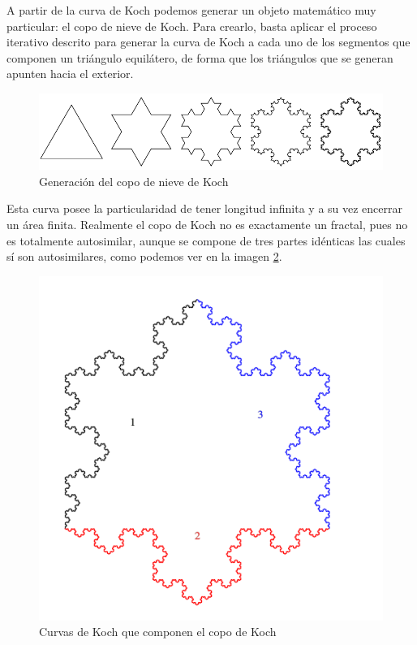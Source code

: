 A partir de la curva de Koch podemos generar un objeto matemático muy particular: el copo de nieve de Koch. Para crearlo, basta aplicar el proceso iterativo descrito para generar la curva de Koch a cada uno de los segmentos que componen un triángulo equilátero, de forma que los triángulos que se generan apunten hacia el exterior.


\begin{figure} [ht]
\centering
\includegraphics[scale = 0.6]{img/copo-Koch.png}
\caption{Generación del copo de nieve de Koch}
\label{fig:copo-Koch}
\end{figure}

Esta curva posee la particularidad de tener longitud infinita y a su vez encerrar un área finita. Realmente el copo de Koch no es exactamente un fractal, pues no es totalmente autosimilar, aunque se compone de tres partes idénticas las cuales sí son autosimilares, como podemos ver en la imagen \ref{fig:copo-Koch-colores}.

\begin{figure} [ht]
\centering
\includegraphics[scale = 0.2]{img/copo-Koch-colores.png}
\caption{Curvas de Koch que componen el copo de Koch}
\label{fig:copo-Koch-colores}
\end{figure}


